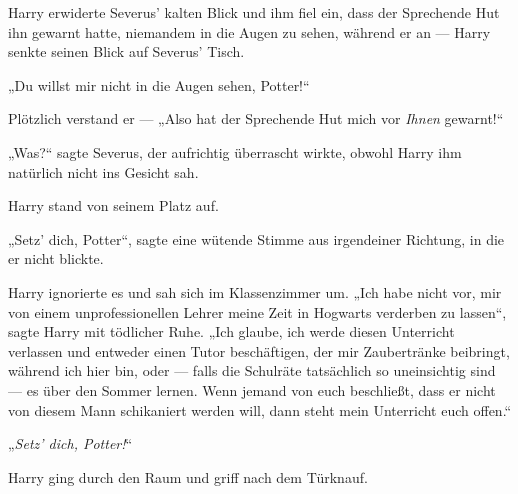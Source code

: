 Harry erwiderte Severus’ kalten Blick und ihm fiel ein, dass der Sprechende Hut ihn gewarnt hatte, niemandem in die Augen zu sehen, während er an — Harry senkte seinen Blick auf Severus’ Tisch.

„Du willst mir nicht in die Augen sehen, Potter!“

Plötzlich verstand er —
„Also hat der Sprechende Hut mich vor \emph{Ihnen} gewarnt!“

„Was?“ sagte Severus, der aufrichtig überrascht wirkte, obwohl Harry ihm natürlich nicht ins Gesicht sah.

Harry stand von seinem Platz auf.

„Setz’ dich, Potter“, sagte eine wütende Stimme aus irgendeiner Richtung, in die er nicht blickte.

Harry ignorierte es und sah sich im Klassenzimmer um.
„Ich habe nicht vor, mir von einem unprofessionellen Lehrer meine Zeit in Hogwarts verderben zu lassen“, sagte Harry mit tödlicher Ruhe.
„Ich glaube, ich werde diesen Unterricht verlassen und entweder einen Tutor beschäftigen, der mir Zaubertränke beibringt, während ich hier bin, oder — falls die Schulräte tatsächlich so uneinsichtig sind — es über den Sommer lernen. Wenn jemand von euch beschließt, dass er nicht von diesem Mann schikaniert werden will, dann steht mein Unterricht euch offen.“

„\emph{Setz’ dich, Potter!}“

Harry ging durch den Raum und griff nach dem Türknauf.

